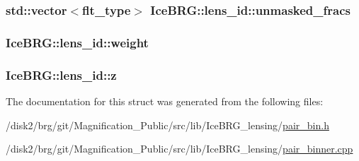 \subsubsection[{unmasked\+\_\+fracs}]{\setlength{\rightskip}{0pt plus 5cm}std\+::vector$<${\bf flt\+\_\+type}$>$ Ice\+B\+R\+G\+::lens\+\_\+id\+::unmasked\+\_\+fracs}\label{structIceBRG_1_1lens__id_a9a3d312cb37f480aa07d94e5a39d714b}
\hypertarget{structIceBRG_1_1lens__id_ab1474c2d0c19469e6bb8c333b2123586}{}
\subsubsection[{weight}]{ Ice\+B\+R\+G\+::lens\+\_\+id\+::weight}\label{structIceBRG_1_1lens__id_ab1474c2d0c19469e6bb8c333b2123586}
\hypertarget{structIceBRG_1_1lens__id_aedfbb8478463687a0aa5982105a9f8fc}{}
\subsubsection[{z}]{ Ice\+B\+R\+G\+::lens\+\_\+id\+::z}\label{structIceBRG_1_1lens__id_aedfbb8478463687a0aa5982105a9f8fc}


The documentation for this struct was generated from the following files\+:\begin{DoxyCompactItemize}
\item 
/disk2/brg/git/\+Magnification\+\_\+\+Public/src/lib/\+Ice\+B\+R\+G\+\_\+lensing/\hyperlink{pair__bin_8h}{pair\+\_\+bin.\+h}\item 
/disk2/brg/git/\+Magnification\+\_\+\+Public/src/lib/\+Ice\+B\+R\+G\+\_\+lensing/\hyperlink{pair__binner_8cpp}{pair\+\_\+binner.\+cpp}\end{DoxyCompactItemize}
